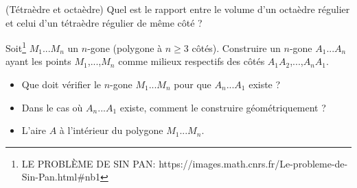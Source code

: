 \begin{exercise}{(Tétraèdre et octaèdre)}
Quel est le rapport entre le volume d'un octaèdre régulier et celui d'un tétraèdre régulier de même côté ?
\end{exercise}
\begin{exercise}
Soit\footnote{LE PROBLÈME DE SIN PAN: https://images.math.cnrs.fr/Le-probleme-de-Sin-Pan.html\#nb1} $M_{1}$...$M_{n}$ un $n$-gone (polygone à $n\geq 3$ côtés). Construire un $n$-gone $A_{1}$...$A_{n}$ ayant les points $M_{1}$,...,$M_{n}$ comme milieux respectifs des côtés $A_{1}A_{2}$,...,$A_{n}A_{1}$.
 \begin{itemize}
   \item Que doit vérifier le $n$-gone $M_{1}$...$M_{n}$ pour que $A_{n}$...$A_{1}$ existe ?
   \item Dans le cas où $A_{n}$...$A_{1}$ existe, comment le construire géométriquement ?
   \item L'aire $A$ à l'intérieur du polygone $M_{1}$...$M_{n}$.
 \end{itemize}

\end{exercise}
